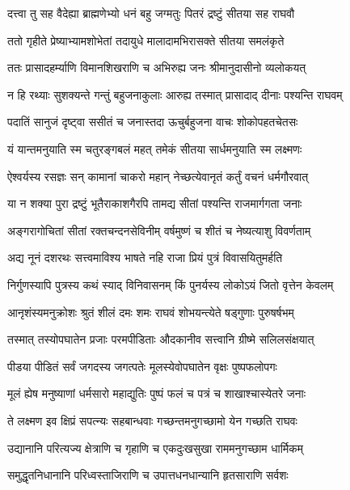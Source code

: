 
\twolineshloka
{दत्त्वा तु सह वैदेह्या ब्राह्मणेभ्यो धनं बहु}
{जग्मतुः पितरं द्रष्टुं सीतया सह राघवौ} %

\twolineshloka
{ततो गृहीते प्रेष्याभ्यामशोभेतां तदायुधे}
{मालादामभिरासक्ते सीतया समलंकृते} %

\twolineshloka
{ततः प्रासादहर्म्याणि विमानशिखराणि च}
{अभिरुह्य जनः श्रीमानुदासीनो व्यलोकयत्} %

\twolineshloka
{न हि रथ्याः सुशक्यन्ते गन्तुं बहुजनाकुलाः}
{आरुह्य तस्मात् प्रासादाद् दीनाः पश्यन्ति राघवम्} %

\twolineshloka
{पदातिं सानुजं दृष्ट्वा ससीतं च जनास्तदा}
{ऊचुर्बहुजना वाचः शोकोपहतचेतसः} %

\twolineshloka
{यं यान्तमनुयाति स्म चतुरङ्गबलं महत्}
{तमेकं सीतया सार्धमनुयाति स्म लक्ष्मणः} %

\twolineshloka
{ऐश्वर्यस्य रसज्ञः सन् कामानां चाकरो महान्}
{नेच्छत्येवानृतं कर्तुं वचनं धर्मगौरवात्} %

\twolineshloka
{या न शक्या पुरा द्रष्टुं भूतैराकाशगैरपि}
{तामद्य सीतां पश्यन्ति राजमार्गगता जनाः} %

\twolineshloka
{अङ्गरागोचितां सीतां रक्तचन्दनसेविनीम्}
{वर्षमुष्णं च शीतं च नेष्यत्याशु विवर्णताम्} %

\twolineshloka
{अद्य नूनं दशरथः सत्त्वमाविश्य भाषते}
{नहि राजा प्रियं पुत्रं विवासयितुमर्हति} %

\twolineshloka
{निर्गुणस्यापि पुत्रस्य कथं स्याद् विनिवासनम्}
{किं पुनर्यस्य लोकोऽयं जितो वृत्तेन केवलम्} %

\twolineshloka
{आनृशंस्यमनुक्रोशः श्रुतं शीलं दमः शमः}
{राघवं शोभयन्त्येते षड्गुणाः पुरुषर्षभम्} %

\twolineshloka
{तस्मात् तस्योपघातेन प्रजाः परमपीडिताः}
{औदकानीव सत्त्वानि ग्रीष्मे सलिलसंक्षयात्} %

\twolineshloka
{पीडया पीडितं सर्वं जगदस्य जगत्पतेः}
{मूलस्येवोपघातेन वृक्षः पुष्पफलोपगः} %

\twolineshloka
{मूलं ह्येष मनुष्याणां धर्मसारो महाद्युतिः}
{पुष्पं फलं च पत्रं च शाखाश्चास्येतरे जनाः} %

\twolineshloka
{ते लक्ष्मण इव क्षिप्रं सपत्न्यः सहबान्धवाः}
{गच्छन्तमनुगच्छामो येन गच्छति राघवः} %

\twolineshloka
{उद्यानानि परित्यज्य क्षेत्राणि च गृहाणि च}
{एकदुःखसुखा राममनुगच्छाम धार्मिकम्} %

\twolineshloka
{समुद्धृतनिधानानि परिध्वस्ताजिराणि च}
{उपात्तधनधान्यानि हृतसाराणि सर्वशः} %

